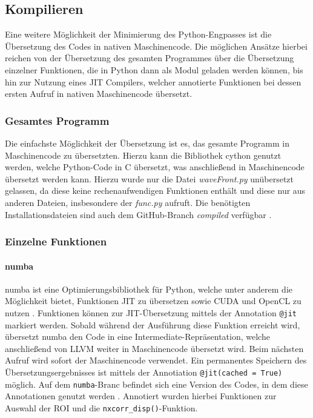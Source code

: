 \subsection{Kompilieren}

Eine weitere Möglichkeit der Minimierung des Python-Engpasses ist die Übersetzung des Codes in nativen Maschinencode. Die möglichen Ansätze hierbei reichen von der Übersetzung des gesamten Programmes über die Übersetzung einzelner Funktionen, die in Python dann als Modul geladen werden können, bis hin zur Nutzung eines \gls{JIT} Compilers, welcher annotierte Funktionen bei dessen ersten Aufruf in nativen Maschinencode übersetzt. 

\subsubsection{Gesamtes Programm}

Die einfachste Möglichkeit der Übersetzung ist es, das gesamte Programm in Maschinencode zu übersetzten. Hierzu kann die Bibliothek cython \cite{BBD+17} genutzt werden, welche Python-Code in C übersetzt, was anschließend in Maschinencode übersetzt werden kann. Hierzu wurde nur die Datei \textit{waveFront.py} unübersetzt gelassen, da diese keine rechenaufwendigen Funktionen enthält und diese nur aus anderen Dateien, insbesondere der \textit{func.py} aufruft. Die benötigten Installationsdateien sind auch dem GitHub-Branch \textit{compiled} verfügbar \cite{Coj17}. 

\subsubsection{Einzelne Funktionen}

\paragraph{numba}

numba ist eine Optimierungsbibliothek für Python, welche unter anderem die Möglichkeit bietet, Funktionen \gls{JIT} zu übersetzen sowie CUDA und OpenCL zu nutzen \cite{LPS15}. Funktionen können zur \gls{JIT}-Übersetzung mittels der Annotation \texttt{@jit} markiert werden. Sobald während der Ausführung diese Funktion erreicht wird, übersetzt numba den Code in eine Intermediate-Repräsentation, welche anschließend von LLVM weiter in Maschinencode übersetzt wird. Beim nächsten Aufruf wird sofort der Maschinencode verwendet. Ein permanentes Speichern des Übersetzungsergebnisses ist mittels der Annotiation \texttt{@jit(cached = True)} möglich. Auf dem \texttt{numba}-Branc befindet sich eine Version des Codes, in dem diese Annotationen genutzt werden \cite{Coj17}. Annotiert wurden hierbei Funktionen zur Auswahl der \gls{ROI} und die \texttt{nxcorr\_disp()}-Funktion.

